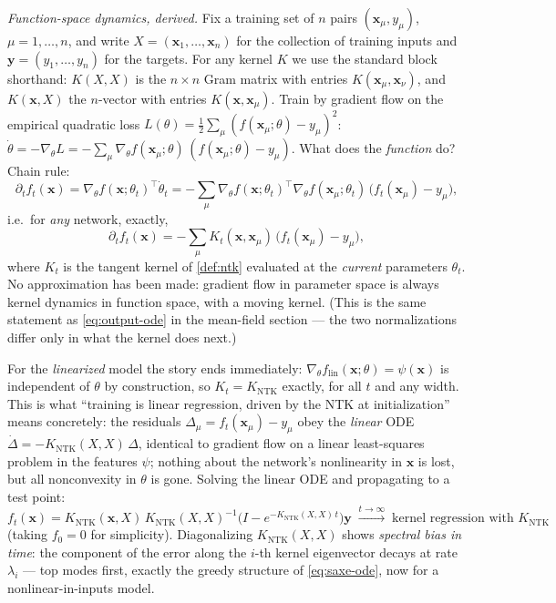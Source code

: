 \documentclass[11pt]{article}
\newcommand{\bv}[1]{\boldsymbol{#1}}
\newcommand{\ntk}{K_{\mathrm{NTK}}}
\begin{document}
\emph{Function-space dynamics, derived.} Fix a training set of $n$ pairs
$(\bv{x}_\mu, y_\mu)$, $\mu = 1, \dots, n$, and write $X =
(\bv{x}_1, \dots, \bv{x}_n)$ for the collection of training inputs and
$\bv{y} = (y_1, \dots, y_n)$ for the targets. For any kernel $K$ we use
the standard block shorthand: $K(X,X)$ is the $n \times n$ Gram matrix
with entries $K(\bv{x}_\mu, \bv{x}_\nu)$, and $K(\bv{x}, X)$ the
$n$-vector with entries $K(\bv{x}, \bv{x}_\mu)$. Train by gradient flow
on the empirical quadratic loss $L(\theta) = \tfrac12\sum_\mu
(f(\bv{x}_\mu;\theta) - y_\mu)^2$:
$\dot\theta = -\nabla_\theta L = -\sum_\mu \nabla_\theta
f(\bv{x}_\mu;\theta)\,(f(\bv{x}_\mu;\theta) - y_\mu)$. What does the
\emph{function} do? Chain rule:
\begin{equation}
  \label{eq:ntk-flow-derivation}
  \partial_t f_t(\bv{x})
  = \nabla_\theta f(\bv{x};\theta_t)^{\top} \dot\theta_t
  = -\sum_{\mu} \nabla_\theta f(\bv{x};\theta_t)^{\top}
  \nabla_\theta f(\bv{x}_\mu;\theta_t)\,
  \bigl(f_t(\bv{x}_\mu) - y_\mu\bigr),
\end{equation}
i.e.\ for \emph{any} network, exactly,
\begin{equation}
  \label{eq:ntk-flow}
  \partial_t f_t(\bv{x}) = -\sum_{\mu}
  K_t(\bv{x}, \bv{x}_\mu)\,\bigl(f_t(\bv{x}_\mu) - y_\mu\bigr),
\end{equation}
where $K_t$ is the tangent kernel of \cref{def:ntk} evaluated at the
\emph{current} parameters $\theta_t$. No approximation has been made:
gradient flow in parameter space is always kernel dynamics in function
space, with a moving kernel. (This is the same statement as
\cref{eq:output-ode} in the mean-field section --- the two normalizations
differ only in what the kernel does next.)

For the \emph{linearized} model the story ends immediately:
$\nabla_\theta f_{\mathrm{lin}}(\bv{x};\theta) = \psi(\bv{x})$ is
independent of $\theta$ by construction, so $K_t = \ntk$ exactly, for all
$t$ and any width. This is what ``training is linear regression, driven
by the NTK at initialization'' means concretely: the residuals
$\Delta_\mu = f_t(\bv{x}_\mu) - y_\mu$ obey the \emph{linear} ODE
$\dot\Delta = -\ntk(X,X)\,\Delta$, identical to gradient flow on a linear
least-squares problem in the features $\psi$; nothing about the network's
nonlinearity in $\bv{x}$ is lost, but all nonconvexity in $\theta$ is
gone. Solving the linear ODE and propagating to a test point:
\begin{equation}
  \label{eq:ntk-solution}
  f_t(\bv{x}) = \ntk(\bv{x},X)\,\ntk(X,X)^{-1}
  \bigl(I - e^{-\ntk(X,X)\,t}\bigr)\bv{y}
  \;\xrightarrow{t\to\infty}\; \text{kernel regression with } \ntk
\end{equation}
(taking $f_0 = 0$ for simplicity). Diagonalizing $\ntk(X,X)$ shows
\emph{spectral bias in time}: the component of the error along the $i$-th
kernel eigenvector decays at rate $\lambda_i$ --- top modes first, exactly
the greedy structure of \cref{eq:saxe-ode}, now for a
nonlinear-in-inputs model.
\end{document}
